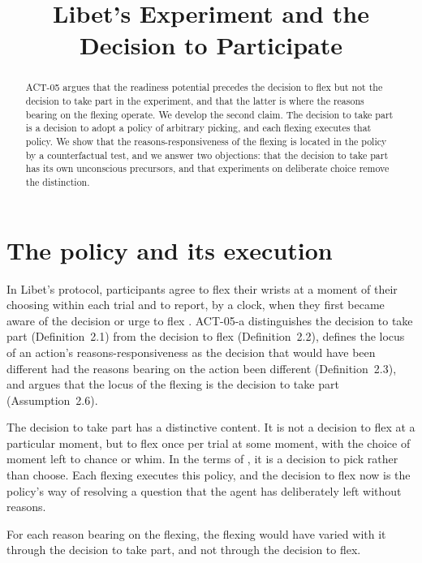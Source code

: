 \documentclass{situationist-preprint}
\title{Libet's Experiment and the Decision to Participate}
\begin{document}
\maketitle

\begin{abstract}
ACT-05 argues that the readiness potential precedes the decision to flex but not the decision to take part in the experiment, and that the latter is where the reasons bearing on the flexing operate. We develop the second claim. The decision to take part is a decision to adopt a policy of arbitrary picking, and each flexing executes that policy. We show that the reasons-responsiveness of the flexing is located in the policy by a counterfactual test, and we answer two objections: that the decision to take part has its own unconscious precursors, and that experiments on deliberate choice remove the distinction.
\end{abstract}

\section{The policy and its execution}

In Libet's protocol, participants agree to flex their wrists at a moment of their choosing within each trial and to report, by a clock, when they first became aware of the decision or urge to flex \citep{Libet1983}. ACT-05-a distinguishes the decision to take part (Definition~2.1) from the decision to flex (Definition~2.2), defines the locus of an action's reasons-responsiveness as the decision that would have been different had the reasons bearing on the action been different (Definition~2.3), and argues that the locus of the flexing is the decision to take part (Assumption~2.6).

The decision to take part has a distinctive content. It is not a decision to flex at a particular moment, but to flex once per trial at some moment, with the choice of moment left to chance or whim. In the terms of \citet{UllmannMargalitMorgenbesser1977}, it is a decision to pick rather than choose. Each flexing executes this policy, and the decision to flex now is the policy's way of resolving a question that the agent has deliberately left without reasons.

\begin{proposition}\label{p:test}
For each reason bearing on the flexing, the flexing would have varied with it through the decision to take part, and not through the decision to flex.
\end{proposition}
\end{document}
